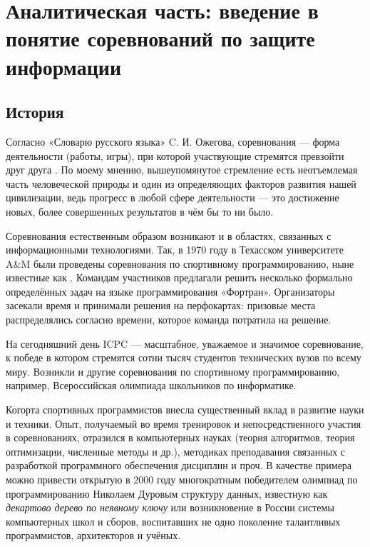 \chapter{Аналитическая часть: введение в понятие соревнований по защите информации}
\label{cha:analysis}

\section{История}

Согласно «Словарю русского языка» C. И. Ожегова, соревнования --- форма деятельности (работы, игры), при которой участвующие стремятся превзойти друг друга \cite{Ozhegov89}. По моему мнению, вышеупомянутое стремление есть неотъемлемая часть человеческой природы и один из определяющих факторов развития нашей цивилизации, ведь прогресс в любой сфере деятельности --- это достижение новых, более совершенных результатов в чём бы то ни было.


Соревнования естественным образом возникают и в областях, связанных с информационными технологиями. Так, в 1970 году в Техасском университете A\&M были проведены соревнования по спортивному программированию, ныне известные как \cite{AboutICPC}. Командам участников предлагали решить несколько формально определённых задач на языке программирования «Фортран». Организаторы засекали время и принимали решения на перфокартах: призовые места распределялись согласно времени, которое команда потратила на решение.

На сегодняшний день ICPC — масштабное, уважаемое и значимое соревнование, к победе в котором стремятся сотни тысяч студентов технических вузов по всему миру. Возникли и другие соревнования по спортивному программированию, например, Всероссийская олимпиада школьников по информатике.

Когорта спортивных программистов внесла существенный вклад в развитие науки и техники. Опыт, получаемый во время тренировок и непосредственного участия в соревнованиях, отразился в компьютерных науках (теория алгоритмов, теория оптимизации, численные методы и др.), методиках преподавания связанных с разработкой программного обеспечения дисциплин и проч. В качестве примера можно привести открытую в 2000 году многократным победителем олимпиад по программированию Николаем Дуровым структуру данных, известную как \textit{декартово дерево по неявному ключу}\cite{Durov00} или возникновение в России системы компьютерных школ и сборов, воспитавших не одно поколение талантливых программистов, архитекторов и учёных\cite{Netrusova09}\cite{Kraivanova12}.


